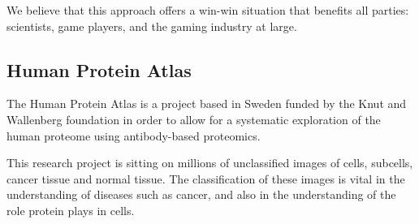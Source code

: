 	We believe that this approach offers a win-win situation that benefits all parties: scientists, game players, and the gaming industry at large. 

\subsection{Human Protein Atlas}
	The Human Protein Atlas is a project based in Sweden funded by the Knut and Wallenberg foundation in order to allow for a systematic exploration of the human proteome using antibody-based proteomics. \cite{http://www.proteinatlas.org/about/project}

	This research project is sitting on millions of unclassified images of cells, subcells, cancer tissue and normal tissue. The classification of these images is vital in the understanding of diseases such as cancer, and also in the understanding of the role protein plays in cells.
